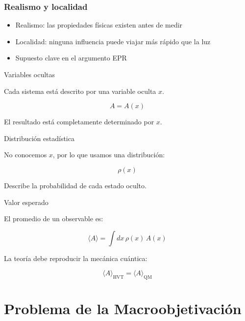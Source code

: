\documentclass[article]{beamer}
\begin{document}

\begin{frame}
\frametitle{Realismo y localidad}

\begin{itemize}
\item Realismo: las propiedades físicas existen antes de medir
\item Localidad: ninguna influencia puede viajar más rápido que la luz
\item Supuesto clave en el argumento EPR
\end{itemize}

\end{frame}





\begin{frame}{Variables ocultas}

Cada sistema está descrito por una variable oculta \(x\).

\[
A = A(x)
\]

El resultado está completamente determinado por \(x\).

\end{frame}


\begin{frame}{Distribución estadística}

No conocemos \(x\), por lo que usamos una distribución:

\[
\rho(x)
\]

Describe la probabilidad de cada estado oculto.

\end{frame}


\begin{frame}{Valor esperado}

El promedio de un observable es:

\[
\langle A \rangle = \int dx \, \rho(x)\, A(x)
\]

La teoría debe reproducir la mecánica cuántica:

\[
\langle A \rangle_{\text{HVT}} = \langle A \rangle_{\text{QM}}
\]

\end{frame}

\section{Problema de la Macroobjetivación}
\end{document}

